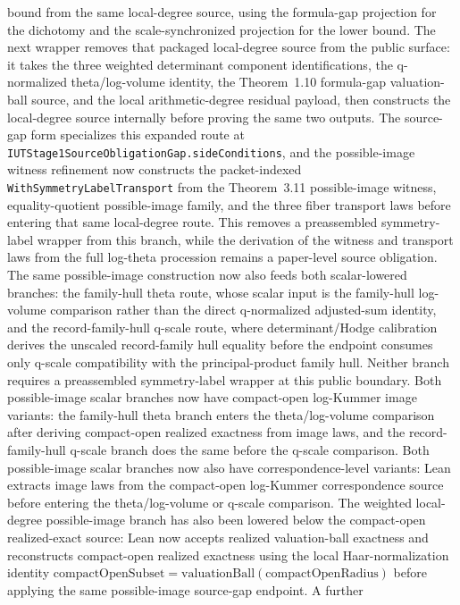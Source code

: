 \documentclass[11pt]{article}
\theoremstyle{plain}
\theoremstyle{definition}
\theoremstyle{remark}
\begin{document}
bound from the same local-degree source, using the formula-gap projection for
the dichotomy and the scale-synchronized projection for the lower bound.
The next wrapper removes that packaged local-degree source from the public
surface: it takes the three weighted determinant component identifications, the
q-normalized theta/log-volume identity, the Theorem~1.10 formula-gap
valuation-ball source, and the local arithmetic-degree residual payload, then
constructs the local-degree source internally before proving the same two
outputs.
The source-gap form specializes this expanded route at
\texttt{IUTStage1SourceObligationGap.sideConditions}, and the possible-image
witness refinement now constructs the packet-indexed
\texttt{WithSymmetryLabelTransport} from the Theorem~3.11 possible-image
witness, equality-quotient possible-image family, and the three fiber
transport laws before entering that same local-degree route.  This removes a
preassembled symmetry-label wrapper from this branch, while the derivation of
the witness and transport laws from the full log-theta procession remains a
paper-level source obligation.  The same possible-image construction now also
feeds both scalar-lowered branches: the family-hull theta route, whose scalar
input is the family-hull log-volume comparison rather than the direct
q-normalized adjusted-sum identity, and the record-family-hull q-scale route,
where determinant/Hodge calibration derives the unscaled record-family hull
equality before the endpoint consumes only q-scale compatibility with the
principal-product family hull.  Neither branch requires a preassembled
symmetry-label wrapper at this public boundary.  Both possible-image scalar
branches now have compact-open log-Kummer image variants: the family-hull
theta branch enters the theta/log-volume comparison after deriving compact-open
realized exactness from image laws, and the record-family-hull q-scale branch
does the same before the q-scale comparison.  Both possible-image scalar
branches now also have correspondence-level variants: Lean extracts image laws
from the compact-open log-Kummer correspondence source before entering the
theta/log-volume or q-scale comparison.  The weighted local-degree
possible-image branch has also been
lowered below the
compact-open realized-exact source: Lean now accepts realized valuation-ball
exactness and reconstructs compact-open realized exactness using the local
Haar-normalization identity
\(\mathrm{compactOpenSubset}=\mathrm{valuationBall}(\mathrm{compactOpenRadius})\)
before applying the same possible-image source-gap endpoint.  A further
\end{document}
